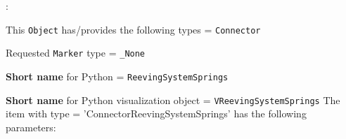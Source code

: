 \noindent {}:
\bi
  \item This \texttt{Object} has/provides the following types = \texttt{Connector}
  \item Requested \texttt{Marker} type = \texttt{\_None}
  \item {\bf Short name} for Python = \texttt{ReevingSystemSprings}
  \item {\bf Short name} for Python visualization object = \texttt{VReevingSystemSprings}
\ei\vspace{12pt} \noindent 
The item  with type = 'ConnectorReevingSystemSprings' has the following parameters:
\vspace{-0.5cm}\\
\vspace{-0.5cm}\\
